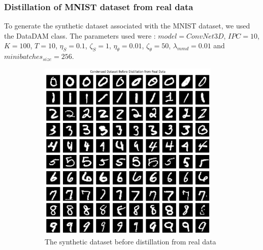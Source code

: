 \documentclass[onecolumn]{IEEEtran}
\begin{document}
\subsubsection{Distillation of MNIST dataset from real data}
To generate the synthetic dataset associated with the MNIST dataset, we used the DataDAM class. The parameters used were : $model = ConvNet3D$, $IPC = 10$, $K=100$, $T=10$, $\eta_S = 0.1$, $\zeta_S = 1$, $\eta_\theta = 0.01$, $\zeta_\theta=50$, $\lambda_{mmd}=0.01$ and $minibatches_{size}=256$.
\begin{figure}[H]
    \centering
    \begin{subfigure}{.5\textwidth}
        \centering
        \includegraphics[width=0.95\textwidth]{images/MNIST_datadam_before_distil_real.png}
        \caption{The synthetic dataset before distillation from real data}
        \label{fig:MNIST_datadam_before_distil_real}
    \end{subfigure}%
    \begin{subfigure}{.5\textwidth}
        \centering

\end{subfigure}
\end{figure}
\end{document}
